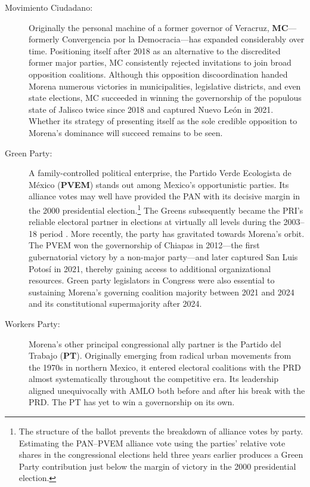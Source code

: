 \documentclass[letter,12pt]{article}
\begin{document}
\begin{description}
\item[Movimiento Ciudadano:] Originally the personal machine of a former governor of Veracruz, \textbf{MC}---formerly Convergencia por la Democracia---has expanded considerably over time. Positioning itself after 2018 as an alternative to the discredited former major parties, MC consistently rejected invitations to join broad opposition coalitions. Although this opposition discoordination handed Morena numerous victories in municipalities, legislative districts, and even state elections, MC succeeded in winning the governorship of the populous state of Jalisco twice since 2018 and captured Nuevo León in 2021. Whether its strategy of presenting itself as the sole credible opposition to Morena's dominance will succeed remains to be seen.

\item[Green Party:] A family-controlled political enterprise, the Partido Verde Ecologista de México (\textbf{PVEM}) stands out among Mexico's opportunistic parties. Its alliance votes may well have provided the PAN with its decisive margin in the 2000 presidential election.\footnote{The structure of the ballot prevents the breakdown of alliance votes by party. Estimating the PAN--PVEM alliance vote using the parties’ relative vote shares in the congressional elections held three years earlier produces a Green Party contribution just below the margin of victory in the 2000 presidential election.} The Greens subsequently became the PRI's reliable electoral partner in elections at virtually all levels during the 2003--18 period \citep{spoon.pulido.PRI-PVEM2017}. More recently, the party has gravitated towards Morena's orbit. The PVEM won the governorship of Chiapas in 2012---the first gubernatorial victory by a non-major party---and later captured San Luis Potosí in 2021, thereby gaining access to additional organizational resources. Green party legislators in Congress were also essential to sustaining Morena's governing coalition majority between 2021 and 2024 and its constitutional supermajority after 2024. 

\item[Workers Party:] Morena's other principal congressional ally partner is the Partido del Trabajo (\textbf{PT}). Originally emerging from radical urban movements from the 1970s in northern Mexico, it entered electoral coalitions with the PRD almost systematically throughout the competitive era. Its leadership aligned unequivocally with AMLO both before and after his break with the PRD. The PT has yet to win a governorship on its own.
\end{description}
\end{document}
